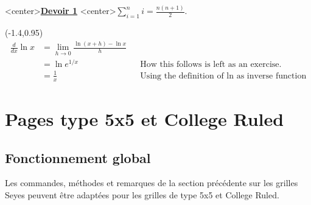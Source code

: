 \documentclass[a4paper]{article}
\begin{document}
\newpage

\pagestyle{empty}

\begin{PleinePageSeyes}[NumLignes]%
	\LignePapierSeyes[Echelle=1.5,Ligne=2,Couleur=red]<center>{\underline{\cursive\bfseries Devoir 1}}
	\ParagraphePapierSeyes[Ligne=10]{\cursive\lipsum[1]}
	\LignePapierSeyes[Ligne=25]<center>{${\displaystyle\sum_{i=1}^{n} i=\displaystyle\frac{n(n+1)}{2}}$.}
	
	\LignePapierSeyes[Echelle=1.1,Ligne=27](-1.4,0.95)
	{
		\begin{align*}
			\frac{d}{dx} \ln x &= \lim_{h\to 0} \frac{\ln(x+h) - \ln x}{h} \\
			&= \ln e^{1/x} &&\text{How this follows is left as an exercise.}\\
			&= \frac{1}{x} &&\text{Using the definition of ln as inverse function}
		\end{align*}
	}
\end{PleinePageSeyes}

\pagebreak

\section{Pages type 5x5 et College Ruled}

\subsection{Fonctionnement global}

Les commandes, méthodes et remarques de la section précédente sur les grilles Seyes peuvent être adaptées pour les grilles de type 5x5 et College Ruled.
\end{document}
